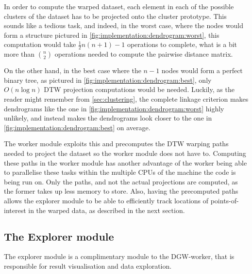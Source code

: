 \documentclass[parskip]{cs4rep}
\begin{document}
In order to compute the warped dataset, each element in each of the possible clusters of the dataset has to be projected onto the cluster prototype. This sounds like a tedious task, and indeed, in the worst case,  where the nodes would form a structure pictured in \autoref{fig:implementation:dendrogram:worst}, this computation would take $\frac{1}{2} n(n+1) - 1$ operations to complete, what is a bit more than ${n \choose 2}$ operations needed to compute the pairwise distance matrix. 

On the other hand, in the best case where the $n-1$ nodes would form a perfect binary tree, as pictured in \autoref{fig:implementation:dendrogram:best}, only $O(n \log n)$ DTW projection computations would be needed. Luckily, as the reader might remember from \autoref{sec:clustering}, the complete linkage criterion makes dendrograms like the one in \autoref{fig:implementation:dendrogram:worst} highly unlikely, and instead makes the dendrograms look closer to the one in \autoref{fig:implementation:dendrogram:best} on average. 

The worker module exploits this and precomputes the DTW warping paths needed to project the dataset so the worker module does not have to. Computing these paths in the worker module has another advantage of the worker being able to parallelise these tasks within the multiple CPUs of the machine the code is being run on. Only the paths, and not the actual projections are computed, as the former takes up less memory to store. Also, having the precomputed paths allows the explorer module to be able to efficiently track locations of points-of-interest in the warped data, as described in the next section.

\subsection{The Explorer module}

The explorer module is a complimentary module to the DGW-worker, that is responsible for result
visualisation and data exploration.
\end{document}
